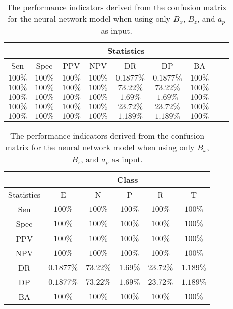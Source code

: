 \begin{table}[!ht]
	\centering
	\begin{tabular}{|c|c|c|c|c|c|c|c|c|}
		\hline
		 & \multicolumn{7}{c|}{Statistics} \\ \hline
		Sen & Spec & PPV & NPV & DR & DP & BA \\ \hline
		$100\%$ & $100\%$ & $100\%$ & $100\%$ & $0.1877\%$ & $0.1877\%$ & $100\%$ \\ \hline
		$100\%$ & $100\%$ & $100\%$ & $100\%$ & $73.22\%$ & $73.22\%$ & $100\%$ \\ \hline
		$100\%$ & $100\%$ & $100\%$ & $100\%$ & $1.69\%$ & $1.69\%$ & $100\%$ \\ \hline
		$100\%$ & $100\%$ & $100\%$ & $100\%$ & $23.72\%$ & $23.72\%$ & $100\%$ \\ \hline
		$100\%$ & $100\%$ & $100\%$ & $100\%$ & $1.189\%$ & $1.189\%$ & $100\%$ \\ \hline
	\end{tabular}
	\caption{The performance indicators derived from the confusion matrix for the neural network model when using only $B_{x}$, $B_{z}$, and $a_{p}$ as input.}
	\label{tab:cs:xzap:nnet}
\end{table}

\begin{table}[!ht]
	\centering
	\begin{tabular}{|c|c|c|c|c|c|}
		\hline
		 & \multicolumn{5}{c|}{Class} \\ \hline
		Statistics & E & N & P & R & T \\ \hline
		Sen & $100\%$ & $100\%$ & $100\%$ & $100\%$ & $100\%$ \\ \hline
		Spec & $100\%$ & $100\%$ & $100\%$ & $100\%$ & $100\%$ \\ \hline
		PPV & $100\%$ & $100\%$ & $100\%$ & $100\%$ & $100\%$ \\ \hline
		NPV & $100\%$ & $100\%$ & $100\%$ & $100\%$ & $100\%$ \\ \hline
		DR & $0.1877\%$ & $73.22\%$ & $1.69\%$ & $23.72\%$ & $1.189\%$ \\ \hline
		DP & $0.1877\%$ & $73.22\%$ & $1.69\%$ & $23.72\%$ & $1.189\%$ \\ \hline
		BA & $100\%$ & $100\%$ & $100\%$ & $100\%$ & $100\%$ \\ \hline
	\end{tabular}
	\caption{The performance indicators derived from the confusion matrix for the neural network model when using only $B_{x}$, $B_{z}$, and $a_{p}$ as input.}
	\label{tab:cs:reverse:xzap:nnet}
\end{table}

